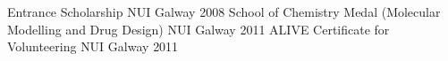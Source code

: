 




\begin{cvhonors}

\cvhonor
{Entrance Scholarship} %
{NUI Galway} %
{} %
{2008} %
\cvhonor
{School of Chemistry Medal (Molecular Modelling and Drug Design)} %
{NUI Galway} %
{} %
{2011} %
\cvhonor
{ALIVE Certificate for Volunteering} %
{NUI Galway} %
{} %
{2011} %

\end{cvhonors}

